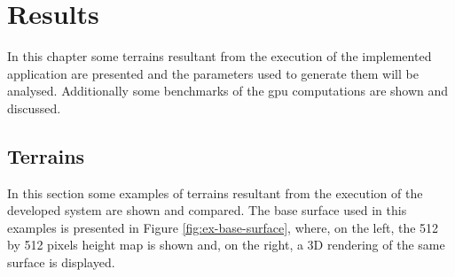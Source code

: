 \chapter{Results} \label{chap:results}

  \newcommand\plotwidth{0.95\textwidth}
  \newcommand\imagewidth{0.35\textwidth}
  	
  In this chapter some terrains resultant from the execution of the implemented application are presented and the parameters used to generate them will be analysed. Additionally some benchmarks of the gpu computations are shown and discussed.

  \section{Terrains} \label{sec:res:terrains}
    
    In this section some examples of terrains resultant from the execution of the developed system are shown and compared. The base surface used in this examples is presented in Figure \ref{fig:ex-base-surface}, where, on the left, the 512 by 512 pixels height map is shown and, on the right, a 3D rendering of the same surface is displayed.
    
